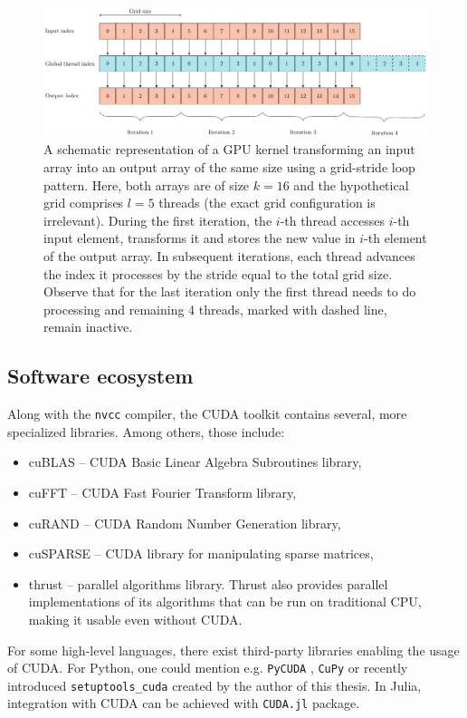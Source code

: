 \begin{example}
  \begin{figure}
    \includegraphics[width=\textwidth]{figures/gpu_scheduling}
    \caption{A schematic representation of a GPU kernel transforming an input array into an
      output array of the same size using a grid-stride loop pattern. Here, both
      arrays are of size $k=16$ and the hypothetical grid comprises $l=5$ threads
      (the exact grid configuration is irrelevant). During the first iteration, the
      $i$-th thread accesses $i$-th input element, transforms it and stores the new
      value in $i$-th element of the output array. In subsequent iterations, each
      thread advances the index it processes by the stride equal to the total grid
      size. Observe that for the last iteration only the first thread needs to do
      processing and remaining 4 threads, marked with dashed line, remain inactive. }
    \label{fig:strided-loop}
  \end{figure}

\end{example}

\subsection{Software ecosystem}
Along with the \texttt{nvcc} compiler, the CUDA toolkit contains several, more
specialized libraries. Among others, those include:
\begin{itemize}
  \item cuBLAS \cite{cublas} -- CUDA Basic Linear Algebra Subroutines library,
  \item cuFFT \cite{cufft} -- CUDA Fast Fourier Transform library,
  \item cuRAND \cite{curand} -- CUDA Random Number Generation library,
  \item cuSPARSE \cite{cusparse} -- CUDA library for manipulating sparse matrices,
  \item thrust \cite{thrust} -- parallel algorithms library. Thrust also
    provides parallel implementations of its algorithms that can be run on
    traditional CPU, making it usable even without CUDA.
\end{itemize}
For some high-level languages, there exist third-party libraries enabling the
usage of CUDA. For Python, one could mention e.g. \texttt{PyCUDA}
\cite{pycuda}, \texttt{CuPy} \cite{cupy} or recently introduced
\texttt{setuptools\_cuda} \cite{setuptoolscuda} created by the author of this
thesis. In Julia, integration with CUDA can be achieved with \texttt{CUDA.jl}
\cite{CUDAjl} package.

